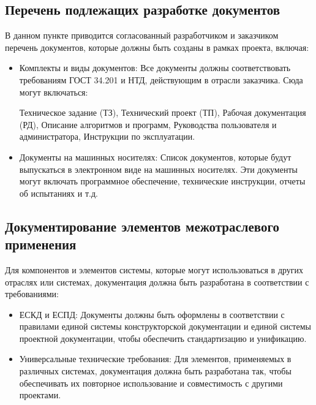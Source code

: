 \subsection{Перечень подлежащих разработке документов}
В данном пункте приводится согласованный разработчиком и заказчиком перечень документов, которые должны быть созданы в рамках проекта, включая:
\begin{itemize}
    \item Комплекты и виды документов: Все документы должны соответствовать требованиям ГОСТ 34.201 и НТД, действующим в отрасли заказчика. Сюда могут включаться:
    \begin{itemize}
        \Item Техническое задание (ТЗ),
        \Item Технический проект (ТП),
        \Item Рабочая документация (РД),
        \Item Описание алгоритмов и программ,
        \Item Руководства пользователя и администратора,
        \Item Инструкции по эксплуатации.
    \end{itemize}
    \item Документы на машинных носителях: Список документов, которые будут выпускаться в электронном виде на машинных носителях. Эти документы могут включать программное обеспечение, технические инструкции, отчеты об испытаниях и т.д.
\end{itemize}

\subsection{Документирование элементов межотраслевого применения}
Для компонентов и элементов системы, которые могут использоваться в других отраслях или системах, документация должна быть разработана в соответствии с требованиями:
\begin{itemize}
    \item ЕСКД и ЕСПД: Документы должны быть оформлены в соответствии с правилами единой системы конструкторской документации и единой системы проектной документации, чтобы обеспечить стандартизацию и унификацию.
    \item Универсальные технические требования: Для элементов, применяемых в различных системах, документация должна быть разработана так, чтобы обеспечивать их повторное использование и совместимость с другими проектами.
\end{itemize}

